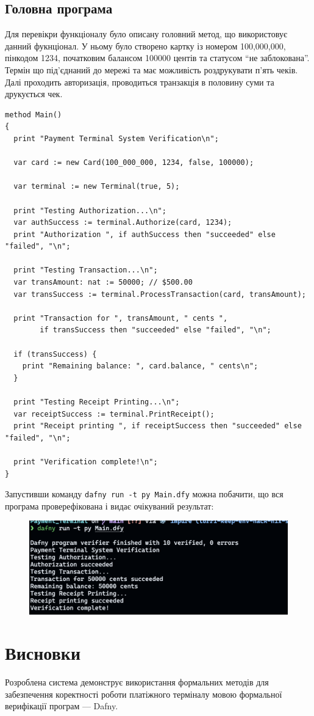 \documentclass[12pt]{article}
\begin{document}
\subsection*{Головна програма}

Для перевікри функціоналу було описану головний метод, що використовує
данний фукнціонал. У ньому було створено картку із номером
100,000,000, пінкодом 1234, початковим балансом 100000 центів та
статусом ``не заблокована''. Термін що під’єднаний до мережі та має
можливість роздрукувати п’ять чеків. Далі проходить авторизація,
проводиться транзакція в половину суми та друкується чек.

\begin{lstlisting}
method Main()
{
  print "Payment Terminal System Verification\n";

  var card := new Card(100_000_000, 1234, false, 100000);

  var terminal := new Terminal(true, 5);

  print "Testing Authorization...\n";
  var authSuccess := terminal.Authorize(card, 1234);
  print "Authorization ", if authSuccess then "succeeded" else "failed", "\n";

  print "Testing Transaction...\n";
  var transAmount: nat := 50000; // $500.00
  var transSuccess := terminal.ProcessTransaction(card, transAmount);

  print "Transaction for ", transAmount, " cents ", 
        if transSuccess then "succeeded" else "failed", "\n";

  if (transSuccess) {
    print "Remaining balance: ", card.balance, " cents\n";
  }

  print "Testing Receipt Printing...\n";
  var receiptSuccess := terminal.PrintReceipt();
  print "Receipt printing ", if receiptSuccess then "succeeded" else "failed", "\n";
  
  print "Verification complete!\n";
}
\end{lstlisting}

Запустивши команду \texttt{dafny run -t py Main.dfy} можна побачити,
що вся програма проверефікована і видає очікуваний результат:

\begin{figure}[h!]
  \centering
  \includegraphics[scale=0.5]{dafny_run_result.png}
\end{figure}

\section*{Висновки}

Розроблена система демонструє використання формальних методів для
забезпечення коректності роботи платіжного терміналу мовою формальної
верифікації програм --- Dafny.
\end{document}
